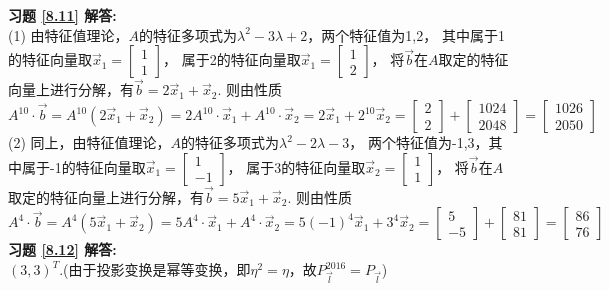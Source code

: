 \textbf{习题 \ref{8.11} 解答:}\\
(1) 由特征值理论，$A$的特征多项式为$\lambda^2-3\lambda+2$，两个特征值为1,2，
其中属于1的特征向量取$\vec{x}_1=\begin{bmatrix}1\\1\end{bmatrix}$，
属于2的特征向量取$\vec{x}_1=\begin{bmatrix}1\\2\end{bmatrix}$，
将$\vec{b}$在$A$取定的特征向量上进行分解，有$\vec{b}=2\vec{x}_1 +\vec{x}_2$.
则由性质$A^{10}\cdot\vec{b}=A^{10}(2\vec{x}_1+\vec{x}_2)=2A^{10}\cdot\vec{x}_1+A^{10}\cdot\vec{x}_2=2\vec{x}_1+2^{10}\vec{x}_2=
\begin{bmatrix}2\\2\end{bmatrix}+ \begin{bmatrix}1024\\2048\end{bmatrix}=\begin{bmatrix}1026\\2050\end{bmatrix}$\\
(2)  同上，由特征值理论，$A$的特征多项式为$\lambda^2-2\lambda-3$，
两个特征值为-1,3，其中属于-1的特征向量取$\vec{x}_1=\begin{bmatrix}1\\-1\end{bmatrix}$，
属于3的特征向量取$\vec{x}_2=\begin{bmatrix}1\\1\end{bmatrix}$，
将$\vec{b}$在$A$取定的特征向量上进行分解，有$\vec{b}=5\vec{x}_1 +\vec{x}_2$.
则由性质$A^4\cdot\vec{b}=A^4(5\vec{x}_1+\vec{x}_2)=5A^4\cdot\vec{x}_1+A^4\cdot\vec{x}_2=5(-1)^4\vec{x}_1+3^4\vec{x}_2=
\begin{bmatrix}5\\-5\end{bmatrix}+ \begin{bmatrix}81\\81\end{bmatrix}=\begin{bmatrix}86\\76\end{bmatrix}$\\
\textbf{习题 \ref{8.12} 解答:}\\
$(3,3)^T$.(由于投影变换是幂等变换，即$\eta^2=\eta$，故$P_{\vec{l}}^{2016}=P_{\vec{l}}$)\\
